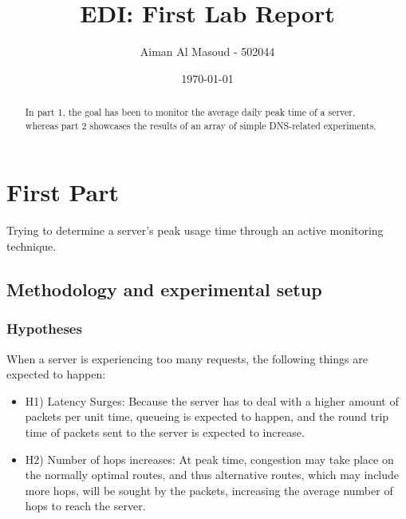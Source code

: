 \documentclass[a4paper,10pt]{article}
\begin{document}
\title{EDI: First Lab Report}
\author{Aiman Al Masoud - 502044}
\date{\today}

\maketitle

\begin{abstract}

In part 1, the goal has been to monitor the average daily peak time of a server, whereas part 2 showcases the results of an array of simple DNS-related experiments.

\end{abstract}

\clearpage

\setcounter{page}{1}

\section{First Part}
Trying to determine a server's peak usage time through an active monitoring technique.

\subsection{Methodology and experimental setup}

\maketitle
\subsubsection{Hypotheses}


When a server is experiencing too many requests, the following things are expected to happen: 


\begin{itemize}

\item \label{hyp1} H1) Latency Surges: Because the server has to deal with a higher amount of packets per unit time, queueing is expected to happen, and the round trip time of packets sent to the server is expected to increase.

\item H2) Number of hops increases: At peak time, congestion may take place on the normally optimal routes, and thus alternative routes, which may include more hops, will be sought by the packets, increasing the average number of hops to reach the server.

\end{itemize}
\end{document}
